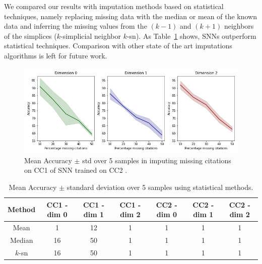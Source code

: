 We compared our results with imputation methods based on statistical techniques, namely replacing missing data with the median or mean of the known data and inferring the missing values from the $(k-1)$ and $(k+1)$ neighbors of the simplices ($k$-simplicial neighbor $k$-sn). As Table~\ref{table:comparison-SNN} shows, SNNs outperform statistical techniques. Comparison with other state of the art imputations algorithms is left for future work.
\begin{figure}[htbp]
  \centering
\includegraphics[scale=0.35]{./figures/accuracy_network1_pretrained.png}
  \caption{ Mean Accuracy $\pm$ std over 5 samples in imputing missing citations on CC1 of SNN trained on CC2 . } \label{fig:transfer-learning}
\end{figure}

\begin{table}[htbp]
  \label{table:comparison-SNN}
  \centering
  \scriptsize{
  \begin{tabular}{c|cccccc}
    \cmidrule(r){1-7}
    Method   & CC1 - dim 0   & CC1 - dim 1   & CC1 - dim 2   & CC2 - dim 0  & CC2 - dim 1  & CC2 - dim 2 \\
    \midrule
    Mean & 1  & 12 & 1  & 1 & 1  & 1\\
    Median & 16 & 50 & 1  & 1& 1  & 1\\
    $k$-sn & 16 & 50& 1  & 1& 1  & 1 \\
    \bottomrule
  \end{tabular}}
  \caption{%
 Mean Accuracy $\pm$ standard deviation over 5 samples using statistical methods. 
  }
\end{table}%
